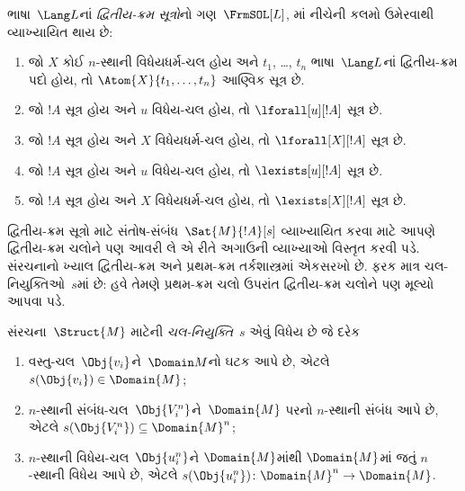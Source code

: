 \begin{defn}[દ્વિતીય-ક્રમ સૂત્ર]
ભાષા~$\Lang L$નાં \emph{દ્વિતીય-ક્રમ સૂત્રો}નો
ગણ~$\FrmSOL[L]$, માં નીચેની કલમો
ઉમેરવાથી વ્યાખ્યાયિત થાય છે:
\begin{enumerate}
\item જો $X$ કોઈ $n$-સ્થાની વિધેયધર્મ-ચલ હોય અને $t_1$, \dots,
  $t_n$ ભાષા~$\Lang L$નાં દ્વિતીય-ક્રમ પદો હોય, તો
  $\Atom{X}{t_1,\ldots, t_n}$ આણ્વિક સૂત્ર છે.

\item જો $!A$ સૂત્ર હોય અને $u$ વિધેય-ચલ હોય,
  તો $\lforall[u][!A]$ સૂત્ર છે.

\item જો $!A$ સૂત્ર હોય અને $X$ વિધેયધર્મ-ચલ હોય,
  તો $\lforall[X][!A]$ સૂત્ર છે.

\item જો $!A$ સૂત્ર હોય અને $u$ વિધેય-ચલ હોય,
  તો $\lexists[u][!A]$ સૂત્ર છે.

\item જો $!A$ સૂત્ર હોય અને $X$ વિધેયધર્મ-ચલ હોય,
  તો $\lexists[X][!A]$ સૂત્ર છે.
\end{enumerate}
\end{defn}
\endgroup


\begingroup
\makeatletter{}\makeatother


\label{guunit:OLP-0326}


\begin{explain}
દ્વિતીય-ક્રમ સૂત્રો માટે સંતોષ-સંબંધ~$\Sat{M}{!A}[s]$
વ્યાખ્યાયિત કરવા માટે આપણે દ્વિતીય-ક્રમ ચલોને પણ આવરી લે
એ રીતે અગાઉની વ્યાખ્યાઓ વિસ્તૃત કરવી પડે. સંરચનાનો ખ્યાલ
દ્વિતીય-ક્રમ અને પ્રથમ-ક્રમ તર્કશાસ્ત્રમાં એકસરખો છે. ફરક માત્ર
ચલ-નિયુક્તિઓ~$s$માં છે: હવે તેમણે પ્રથમ-ક્રમ ચલો ઉપરાંત
દ્વિતીય-ક્રમ ચલોને પણ મૂલ્યો આપવા પડે.
\end{explain}

\begin{defn}[ચલ-નિયુક્તિ]
સંરચના~$\Struct{M}$ માટેની \emph{ચલ-નિયુક્તિ}~$s$ એવું
વિધેય છે જે દરેક
\begin{enumerate}
\item વસ્તુ-ચલ~$\Obj{v_i}$ને~$\Domain M$નો ઘટક આપે છે,
  એટલે $s(\Obj{v_i}) \in \Domain{M}$;
\item $n$-સ્થાની સંબંધ-ચલ~$\Obj{V_i^n}$ને~$\Domain{M}$ પરનો
  $n$-સ્થાની સંબંધ આપે છે, એટલે
  $s(\Obj{V_i^n}) \subseteq \Domain{M}^n$;
\item $n$-સ્થાની વિધેય-ચલ~$\Obj{u_i^n}$ને $\Domain{M}$માંથી
  $\Domain{M}$માં જતું $n$-સ્થાની વિધેય આપે છે, એટલે
  $s(\Obj{u_i^n})\colon \Domain{M}^n \to \Domain{M}$.
\end{enumerate}
\end{defn}

